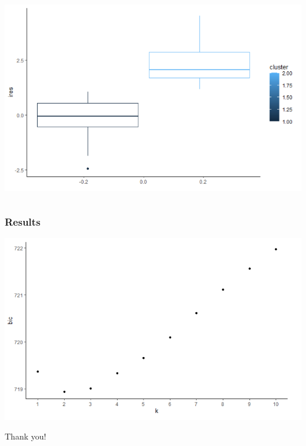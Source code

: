 \documentclass[hyperref={pdfpagelabels=false}]{beamer}
\begin{document}
\begin{frame}
\begin{columns}[t]
			\includegraphics[width = \textwidth]{fig/ChenBox.png}
		\end{columns}
\end{frame}

\begin{frame}
	\frametitle{Results}
		\includegraphics[width = \textwidth]{fig/ChenBic.png}\\

\end{frame}

\begin{frame}
	\Large
	\centering
	Thank you!
\end{frame}
\end{document}
